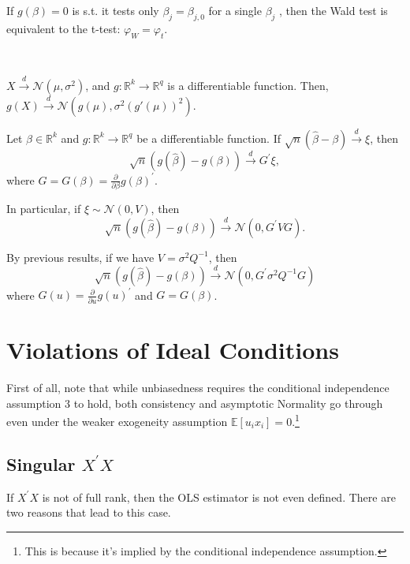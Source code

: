If $g(\beta)=0$ is s.t. it tests only $\beta_{j}=\beta_{j, 0}$ for a single $\beta_{j}$ , then the Wald test is equivalent to the t-test:  $\varphi_{W}=\varphi_{t}$.

\begin{theorem}
  \

  $X \overset{d}{\rightarrow}\mathcal{N} (\mu, \sigma^2)$, and $g: \mathbb{R}^k \rightarrow \mathbb{R}^q$ is a differentiable function. 
  Then, $g(X) \overset{d}{\rightarrow} \mathcal{N} (g(\mu), \sigma^2(g'(\mu))^2)$.

  Let $\beta \in \mathbb{R}^k$ and $g: \mathbb{R}^k \rightarrow \mathbb{R}^q$ be a differentiable function.
  If $\sqrt{n}(\hat{\beta} - \beta) \overset{d}{\rightarrow} \xi$, then
  \[ 
  \sqrt{n}(g(\hat{\beta}) - g(\beta)) \overset{d}{\rightarrow} G^{\prime} \xi,
  \]
  where $G = G(\beta) = \frac{\partial}{\partial \beta}g(\beta)^{\prime}.$

  In particular, if $\xi \sim \mathcal{N}(0, V)$, then
  \[\sqrt{n}(g(\hat{\beta}) - g(\beta)) \overset{d}{\rightarrow} \mathcal{N}(0, G^{\prime} V G).\]

  By previous results, if we have $V = \sigma^2 Q^{-1}$, then
  \[ 
    \sqrt{n}(g(\hat{\beta}) - g(\beta)) \overset{d}{\rightarrow} \mathcal{N} (0, G^{\prime}\sigma^2 Q^{-1} G)
  \]
  where $G(u) = \frac{\partial}{\partial u}g(u)^{\prime} $ and $G = G(\beta )$.
\end{theorem}

\section{Violations of Ideal Conditions}

First of all, note that while unbiasedness requires the conditional independence assumption
3 to hold, both consistency and asymptotic Normality go through even under the weaker
exogeneity assumption $\mathbb{E}[u_i x_i] = 0.$\footnote{This is because it's implied by the conditional independence assumption.}

\subsection{Singular $X^{\prime} X$}
If $X^{\prime} X$ is not of full rank, then the OLS estimator is not even defined. There are two reasons
that lead to this case.

